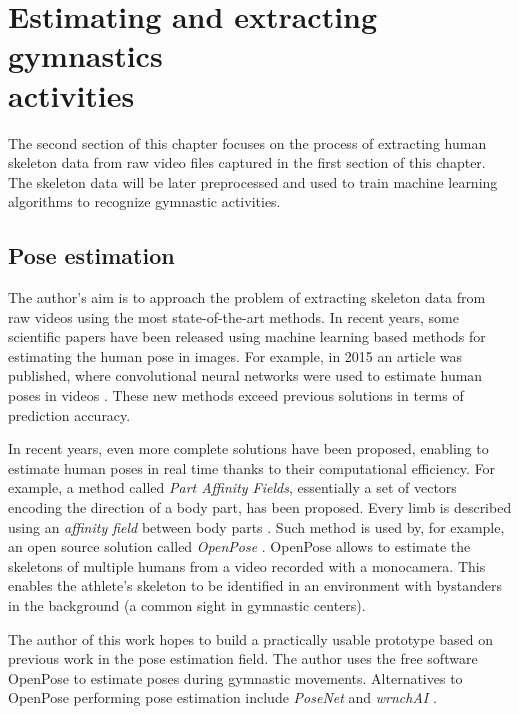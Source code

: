 \section{Estimating and extracting gymnastics \\ activities}
\label{estimating-and-collecting-human-action-poses}

The second section of this chapter focuses on the process of extracting human skeleton data from raw video files captured in the first section of this chapter. The skeleton data will be later preprocessed and used to train machine learning algorithms to recognize gymnastic activities.

\subsection{Pose estimation}
\label{pose-estimation}

The author's aim is to approach the problem of extracting skeleton data from raw videos using the most state-of-the-art methods. In recent years, some scientific papers have been released using machine learning based methods for estimating the human pose in images. For example, in 2015 an article was published, where convolutional neural networks were used to estimate human poses in videos \cite{poseestimation2015convnets}. These new methods exceed previous solutions in terms of prediction accuracy.

In recent years, even more complete solutions have been proposed, enabling to estimate human poses in real time thanks to their computational efficiency. For example, a method called \textit{Part Affinity Fields}, essentially a set of vectors encoding the direction of a body part, has been proposed. Every limb is described using an \textit{affinity field} between body parts \cite{DBLP:journals/corr/CaoSWS16}. Such method is used by, for example, an open source solution called \textit{OpenPose} \cite{DBLP:journals/corr/abs-1812-08008}. OpenPose allows to estimate the skeletons of multiple humans from a video recorded with a monocamera. This enables the athlete's skeleton to be identified in an environment with bystanders in the background (a common sight in gymnastic centers).

The author of this work hopes to build a practically usable prototype based on previous work in the pose estimation field. The author uses the free software OpenPose to estimate poses during gymnastic movements. Alternatives to OpenPose performing pose estimation include \textit{PoseNet} \cite{posenet} and \textit{wrnchAI} \cite{wrnchai}.

